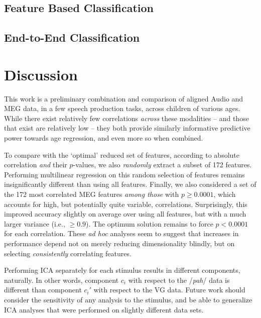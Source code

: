 \documentclass[utf8]{frontiersSCNS} %
\begin{document}

\subsection{Feature Based Classification}

\subsection{End-to-End Classification}

\section{Discussion}

This work is a preliminary combination and comparison of aligned Audio and MEG data, in a few speech production tasks, across children of various ages. While there exist relatively few correlations {\em across} these modalities -- and those that exist are relatively low -- they both provide similarly informative predictive power towards age regression, and even more so when combined.

To compare with the `optimal' reduced set of features, according to absolute correlation {\em and} their $p$-values, we also {\em randomly} extract a subset of 172 features. Performing multilinear regression on this random selection of features remains insignificantly different than using all features. Finally, we also considered a set of the 172 most correlated MEG features {\em among those} with $p \geq 0.0001$, which accounts for high, but potentially quite variable, correlations. Surprisingly, this improved accuracy slightly on average over using all features, but with a much larger variance (i.e., $\geq 0.9$). The optimum solution remains to force $p<0.0001$ for each correlation. These {\em ad hoc} analyses seem to suggest that increases in performance depend not on merely reducing dimensionality blindly, but on selecting {\em consistently} correlating features.

Performing ICA separately for each stimulus results in different components, naturally. In other words, component $c_i$ with respect to the /{\em pah}/ data is different than component $c_i'$ with respect to the VG data. Future work should consider the sensitivity of any analysis to the stimulus, and be able to generalize ICA analyses that were performed on slightly different data sets.
\end{document}
